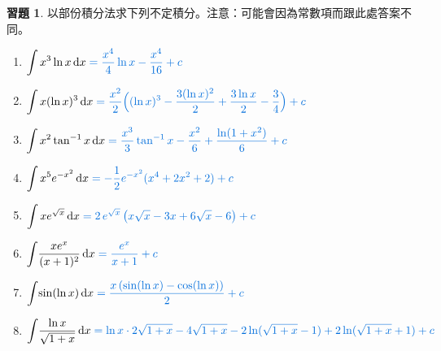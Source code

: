 \documentclass[12pt]{extarticle}
\newcommand{\ds}{\displaystyle}
\theoremstyle{definition}
\newtheorem*{exe}{習題}
\begin{document}
\begin{exe} 以部份積分法求下列不定積分。注意：可能會因為常數項而跟此處答案不同。
  \begin{enumerate}\setlength{\itemsep}{0pt}
    \item $\ds\int x^3\ln x\,\mathrm{d}x {\color{C2}\;= \frac{x^4}{4}\ln x -\frac{x^4}{16} + c}$
    \item $\ds\int x(\ln x)^3\,\mathrm{d}x {\color{C2}\;= \frac{x^2}{2}\Big((\ln x)^3 -\frac{3(\ln x)^2}{2} + \frac{3\ln x}{2} - \frac{3}{4} \Big) + c}$
    \item $\ds\int x^2\tan^{-1} x\,\mathrm{d}x {\color{C2}\;= \frac{x^3}{3}\tan^{-1} x - \frac{x^2}{6} + \frac{\ln(1 + x^2)}{6} + c}$
    \item $\ds\int x^5 e^{-x^2}\,\mathrm{d}x {\color{C2}\;= -\frac{1}{2}e^{-x^2}(x^4 + 2x^2 + 2) + c}$
    \item $\ds\int x e^{\sqrt{x}}\,\mathrm{d}x {\color{C2}\;= 2\,e^{\sqrt{x}}\,\big(x\sqrt{x} - 3x + 6\sqrt{x} - 6\big) + c}$
    \item $\ds\int\!\frac{x e^x}{(x + 1)^2}\,\mathrm{d}x {\color{C2}\;= \frac{e^x}{x + 1} + c}  $
    \item $\ds\int\!\sin(\ln x)\,\mathrm{d}x {\color{C2}\;= \frac{x\,(\sin(\ln x) - \cos(\ln x))}{2} + c}$
    \item $\ds\int\!\frac{\ln x}{\sqrt{1 + x}}\,\mathrm{d}x {\color{C2}\;= \ln x\cdot 2\sqrt{1 + x} - 4\sqrt{1+x} - 2\ln(\sqrt{1 + x}-1) + 2\ln(\sqrt{1+x} + 1) + c}$
  \end{enumerate}
\end{exe}
\end{document}
